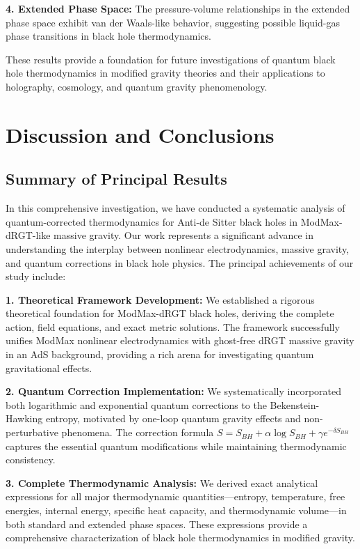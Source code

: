 \documentclass[12pt]{article}
\begin{document}
\textbf{4. Extended Phase Space:} The pressure-volume relationships in the extended phase space exhibit van der Waals-like behavior, suggesting possible liquid-gas phase transitions in black hole thermodynamics.

These results provide a foundation for future investigations of quantum black hole thermodynamics in modified gravity theories and their applications to holography, cosmology, and quantum gravity phenomenology.

\section{Discussion and Conclusions}

\subsection{Summary of Principal Results}

In this comprehensive investigation, we have conducted a systematic analysis of quantum-corrected thermodynamics for Anti-de Sitter black holes in ModMax-dRGT-like massive gravity. Our work represents a significant advance in understanding the interplay between nonlinear electrodynamics, massive gravity, and quantum corrections in black hole physics. The principal achievements of our study include:

\textbf{1. Theoretical Framework Development:} We established a rigorous theoretical foundation for ModMax-dRGT black holes, deriving the complete action, field equations, and exact metric solutions. The framework successfully unifies ModMax nonlinear electrodynamics with ghost-free dRGT massive gravity in an AdS background, providing a rich arena for investigating quantum gravitational effects.

\textbf{2. Quantum Correction Implementation:} We systematically incorporated both logarithmic and exponential quantum corrections to the Bekenstein-Hawking entropy, motivated by one-loop quantum gravity effects and non-perturbative phenomena. The correction formula $S = S_{BH} + \alpha \log S_{BH} + \gamma e^{-\delta S_{BH}}$ captures the essential quantum modifications while maintaining thermodynamic consistency.

\textbf{3. Complete Thermodynamic Analysis:} We derived exact analytical expressions for all major thermodynamic quantities—entropy, temperature, free energies, internal energy, specific heat capacity, and thermodynamic volume—in both standard and extended phase spaces. These expressions provide a comprehensive characterization of black hole thermodynamics in modified gravity.
\end{document}

